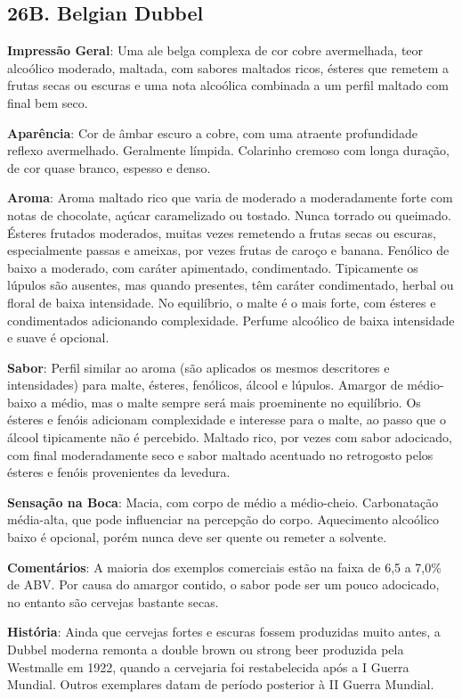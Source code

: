 \subsection*{26B. Belgian Dubbel}

\textbf{Impressão Geral}: Uma ale belga complexa de cor cobre avermelhada, teor alcoólico moderado, maltada, com sabores maltados ricos, ésteres que remetem a frutas secas ou escuras e uma nota alcoólica combinada a um perfil maltado com final bem seco.

\textbf{Aparência}: Cor de âmbar escuro a cobre, com uma atraente profundidade reflexo avermelhado. Geralmente límpida. Colarinho cremoso com longa duração, de cor quase branco, espesso e denso.

\textbf{Aroma}: Aroma maltado rico que varia de moderado a moderadamente forte com notas de chocolate, açúcar caramelizado ou tostado. Nunca torrado ou queimado. Ésteres frutados moderados, muitas vezes remetendo a frutas secas ou escuras, especialmente passas e ameixas, por vezes frutas de caroço e banana. Fenólico de baixo a moderado, com caráter apimentado, condimentado. Tipicamente os lúpulos são ausentes, mas quando presentes, têm caráter condimentado, herbal ou floral de baixa intensidade. No equilíbrio, o malte é o mais forte, com ésteres e condimentados adicionando complexidade. Perfume alcoólico de baixa intensidade e suave é opcional.

\textbf{Sabor}: Perfil similar ao aroma (são aplicados os mesmos descritores e intensidades) para malte, ésteres, fenólicos, álcool e lúpulos. Amargor de médio-baixo a médio, mas o malte sempre será mais proeminente no equilíbrio. Os ésteres e fenóis adicionam complexidade e interesse para o malte, ao passo que o álcool tipicamente não é percebido. Maltado rico, por vezes com sabor adocicado, com final moderadamente seco e sabor maltado acentuado no retrogosto pelos ésteres e fenóis provenientes da levedura.

\textbf{Sensação na Boca}: Macia, com corpo de médio a médio-cheio. Carbonatação média-alta, que pode influenciar na percepção do corpo. Aquecimento alcoólico baixo é opcional, porém nunca deve ser quente ou remeter a solvente.

\textbf{Comentários}: A maioria dos exemplos comerciais estão na faixa de 6,5 a 7,0\% de ABV. Por causa do amargor contido, o sabor pode ser um pouco adocicado, no entanto são cervejas bastante secas.

\textbf{História}: Ainda que cervejas fortes e escuras fossem produzidas muito antes, a Dubbel moderna remonta a double brown ou strong beer produzida pela Westmalle em 1922, quando a cervejaria foi restabelecida após a I Guerra Mundial. Outros exemplares datam de período posterior à II Guerra Mundial.


